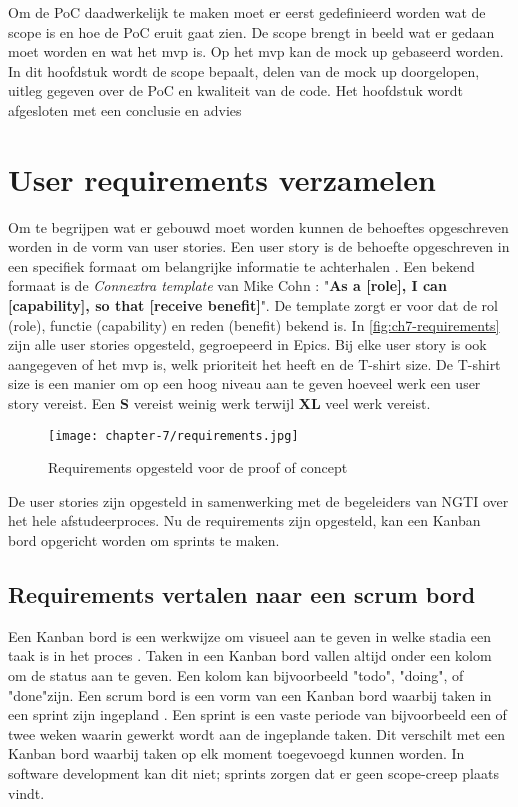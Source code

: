 Om de PoC daadwerkelijk te maken moet er eerst gedefinieerd worden wat de scope is en hoe de PoC eruit gaat zien. De scope brengt in beeld wat er gedaan moet worden en wat het \acrfull{mvp} is. Op het \acrshort{mvp} kan de mock up gebaseerd worden. In dit hoofdstuk wordt de scope bepaalt, delen van de mock up doorgelopen, uitleg gegeven over de PoC en kwaliteit van de code. Het hoofdstuk wordt afgesloten met een conclusie en advies

\section{User requirements verzamelen}\label{sec:ch7-user-requirements-verzamelen}
Om te begrijpen wat er gebouwd moet worden kunnen de behoeftes opgeschreven worden in de vorm van user stories. Een user story is de behoefte opgeschreven in een specifiek formaat om belangrijke informatie te achterhalen \cite{agile-user-story-template}. Een bekend formaat is de \textit{Connextra template} van Mike Cohn \cite{agile-user-story-template}: "\textbf{As a [role], I can [capability], so that [receive benefit]}". De template zorgt er voor dat de rol (role), functie (capability) en reden (benefit) bekend is. In \autoref{fig:ch7-requirements} zijn alle user stories opgesteld, gegroepeerd in Epics. Bij elke user story is ook aangegeven of het \acrshort{mvp} is, welk prioriteit het heeft en de T-shirt size. De T-shirt size is een manier om op een hoog niveau aan te geven hoeveel werk een user story vereist. Een \textbf{S} vereist weinig werk terwijl \textbf{XL} veel werk vereist.

\begin{figure}[hbt!]
  \centering
  \texttt{[image: chapter-7/requirements.jpg]}
  \caption{Requirements opgesteld voor de proof of concept}
  \label{fig:ch7-requirements}
\end{figure}

De user stories zijn opgesteld in samenwerking met de begeleiders van NGTI over het hele afstudeerproces. Nu de requirements zijn opgesteld, kan een Kanban bord opgericht worden om sprints te maken.

\newpage

\subsection{Requirements vertalen naar een scrum bord}\label{subsec:ch7-requirements-vertalen-naar-een-scrum-bord}
Een Kanban bord is een werkwijze om visueel aan te geven in welke stadia een taak is in het proces \cite{atlassian-kanban-board}. Taken in een Kanban bord vallen altijd onder een kolom om de status aan te geven. Een kolom kan bijvoorbeeld "todo", "doing", of "done"\space zijn. Een scrum bord is een vorm van een Kanban bord waarbij taken in een sprint zijn ingepland \cite{forecast-scrum-board}. Een sprint is een vaste periode van bijvoorbeeld een of twee weken waarin gewerkt wordt aan de ingeplande taken. Dit verschilt met een Kanban bord waarbij taken op elk moment toegevoegd kunnen worden. In software development kan dit niet; sprints zorgen dat er geen \gls{scope-creep} plaats vindt.

